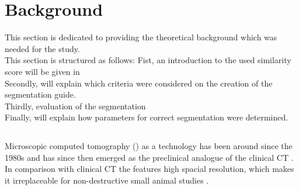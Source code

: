



\chapter{Background}\label{c:background}
This section is dedicated to providing the theoretical background which was needed for the study.\\
This section is structured as follows:
Fist, an introduction to the used similarity score will be given in %
\\
Secondly,
will explain which criteria were considered on the creation of the segmentation guide.\\
Thirdly, evaluation of the segmentation\\
Finally,
will explain how parameters for correct segmentation were determined. %


\section{\mct}\label{s:b-microct}
Microscopic computed tomography (\mct) as a technology has been around since the 1980s and has since then emerged as the preclinical analogue of the clinical CT \cite{clarkAdvancesMicroCTImaging2021,ritmanCurrentStatusDevelopments2011}.
In comparison with clinical CT the \mct\space features high spacial resolution, which makes it irreplaceable for non-destructive small animal studies \cite{clarkAdvancesMicroCTImaging2021,ritmanCurrentStatusDevelopments2011,keklikoglouMicroCTBiologicalBiomedical2021}.


